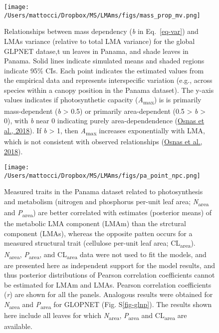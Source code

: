 \documentclass[
  12pt,
  a4paper,
,tablecaptionabove
]{scrartcl}
\begin{document}
\begin{figure}

{\centering \texttt{[image: /Users/mattocci/Dropbox/MS/LMAms/figs/mass\_prop\_mv.png]}

}

\caption{\label{fig-massplt}Relationships between mass dependency
(\emph{b} in Eq.~\ref{eq-var}) and LMAs variance (relative to total LMA
variance) for the global GLPNET datase,t un leaves in Panama, and shade
leaves in Panama. Solid lines indicate simulated means and shaded
regions indicate 95\% CIs. Each point indicates the estimated values
from the empirical data and represents interspecific variation (e.g.,
across species within a canopy position in the Panama dataset). The
y-axis values indicates if photosynthetic capacity
(\emph{A}\textsubscript{max}) is is primarily mass-dependent (\emph{b}
\textgreater{} 0.5) or primarily area-dependent (0.5 \textgreater{}
\emph{b} \textgreater{} 0), with \emph{b} near 0 indicating purely
area-dependendence (\protect\hyperlink{ref-Osnas2018}{Osnas et al.,
2018}). If \emph{b} \textgreater{} 1, then \emph{A}\textsubscript{max}
increases exponentially with LMA, which is not consistent with observed
relationships (\protect\hyperlink{ref-Osnas2018}{Osnas et al., 2018}).}

\end{figure}

\newpage

\begin{figure}

{\centering \texttt{[image: /Users/mattocci/Dropbox/MS/LMAms/figs/pa\_point\_npc.png]}

}

\caption{\label{fig-PA-NPC}Measured traits in the Panama dataset related
to photosynthesis and metabolism (nitrogen and phosphorus per-unit leaf
area; \emph{N}\textsubscript{area} and \emph{P}\textsubscript{area}) are
better correlated with estimates (posterior means) of the metabolic LMA
component (LMAm) than the strctural component (LMAs), whereas the
opposite patten occurs for a measured structural trait (cellulose
per-unit leaf area; CL\textsubscript{area}).
\emph{N}\textsubscript{area}, \emph{P}\textsubscript{area}, and
CL\textsubscript{area} data were not used to fit the models, and are
presented here as independent support for the model results, and thus
posterior distributions of Pearson correlation coefficients cannot be
estimated for LMAm and LMAs. Pearson correlation coefficients (\emph{r})
are shown for all the panels. Analogous results were obtained for
\emph{N}\textsubscript{area} and \emph{P}\textsubscript{area} for
GLOPNET (Fig. S\ref{fig-glnp}). The results shown here include all
leaves for which \emph{N}\textsubscript{area},
\emph{P}\textsubscript{area} and CL\textsubscript{area} are available.}

\end{figure}
\end{document}
